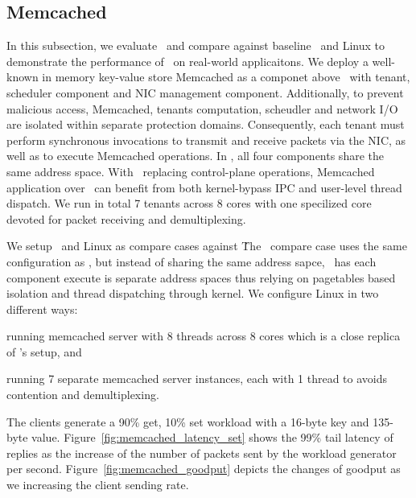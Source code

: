 \subsection{Memcached}
\label{ss:memcached}
In this subsection, we evaluate \name\ and compare against baseline \cos\ and Linux to demonstrate the performance of \name\ on real-world applicaitons.
We deploy a well-known in memory key-value store Memcached as a componet above \name\ with tenant, scheduler component and NIC management component.
Additionally, to prevent malicious access, Memcached, tenants computation, scheudler and network I/O are isolated within separate protection domains.
Consequently, each tenant must perform synchronous invocations to transmit and receive packets via the NIC, as well as to execute Memcached operations.
In \name , all four components share the same address space.
With \name\ replacing control-plane operations, Memcached application over \name\ can benefit from both kernel-bypass IPC and user-level thread dispatch.
We run in total 7 tenants across 8 cores with one specilized core devoted for packet receiving and demultiplexing.

We setup \cos\ and Linux as compare cases against \name\. 
The \cos\ compare case uses the same configuration as \name , but instead of sharing the same address sapce, \cos\ has each component execute is separate address spaces thus relying on pagetables based isolation and thread dispatching through kernel.
We configure Linux in two different ways:
\begin{inparaenum}[(1)]
\item running memcached server with 8 threads across 8 cores which is a close replica of \name 's setup, and
\item running 7 separate memcached server instances, each with 1 thread to avoids contention and demultiplexing.
\end{inparaenum}
The clients generate a 90\% get, 10\% set workload with a 16-byte key and 135-byte value. 
Figure~\ref{fig:memcached_latency_set} shows the 99\% tail latency of replies as the increase of the number of packets sent by the workload generator per second.
Figure~\ref{fig:memcached_goodput} depicts the changes of goodput as we increasing the client sending rate.

